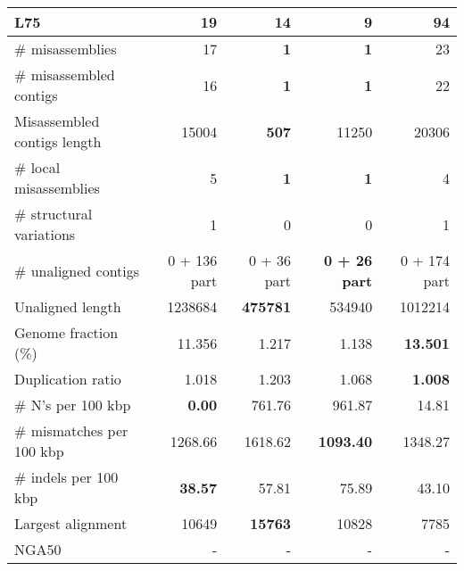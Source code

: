 \documentclass[12pt,a4paper]{article}
\begin{document}
\begin{table}[ht]
\begin{center}
\begin{tabular}{|l*{4}{|r}|}
L75 & 19 & 14 & {\bf 9} & 94 \\ \hline
\# misassemblies & 17 & {\bf 1} & {\bf 1} & 23 \\ \hline
\# misassembled contigs & 16 & {\bf 1} & {\bf 1} & 22 \\ \hline
Misassembled contigs length & 15004 & {\bf 507} & 11250 & 20306 \\ \hline
\# local misassemblies & 5 & {\bf 1} & {\bf 1} & 4 \\ \hline
\# structural variations & 1 & 0 & 0 & 1 \\ \hline
\# unaligned contigs & 0 + 136 part & 0 + 36 part & {\bf 0 + 26 part} & 0 + 174 part \\ \hline
Unaligned length & 1238684 & {\bf 475781} & 534940 & 1012214 \\ \hline
Genome fraction (\%) & 11.356 & 1.217 & 1.138 & {\bf 13.501} \\ \hline
Duplication ratio & 1.018 & 1.203 & 1.068 & {\bf 1.008} \\ \hline
\# N's per 100 kbp & {\bf 0.00} & 761.76 & 961.87 & 14.81 \\ \hline
\# mismatches per 100 kbp & 1268.66 & 1618.62 & {\bf 1093.40} & 1348.27 \\ \hline
\# indels per 100 kbp & {\bf 38.57} & 57.81 & 75.89 & 43.10 \\ \hline
Largest alignment & 10649 & {\bf 15763} & 10828 & 7785 \\ \hline
NGA50 & - & - & - & - \\ \hline
\end{tabular}
\end{center}
\end{table}
\end{document}
